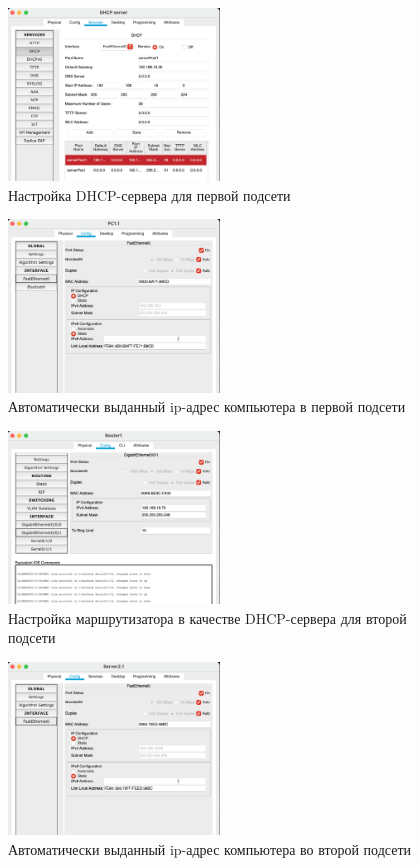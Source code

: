 \begin{figure}[H]
    \centering
    \includegraphics[width=0.5\textwidth]{img/content/DHCP_1.png}
    \caption{Настройка DHCP-сервера для первой подсети}
\end{figure}

\begin{figure}[H]
    \centering
    \includegraphics[width=0.5\textwidth]{img/content/PC_1.png}
    \caption{Автоматически выданный ip-адрес компьютера в первой подсети}
\end{figure}

\begin{figure}[H]
    \centering
    \includegraphics[width=0.5\textwidth]{img/content/DHCP_2.png}
    \caption{Настройка маршрутизатора в качестве DHCP-сервера для второй подсети}
\end{figure}

\begin{figure}[H]
    \centering
    \includegraphics[width=0.5\textwidth]{img/content/PC_2.png}
    \caption{Автоматически выданный ip-адрес компьютера во второй подсети}
\end{figure}

